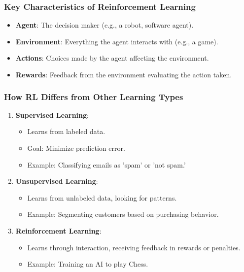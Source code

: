 \documentclass[aspectratio=169]{beamer}
\begin{document}
\begin{frame}[fragile]
    \frametitle{Key Characteristics of Reinforcement Learning}
    \begin{itemize}
        \item \textbf{Agent}: The decision maker (e.g., a robot, software agent).
        \item \textbf{Environment}: Everything the agent interacts with (e.g., a game).
        \item \textbf{Actions}: Choices made by the agent affecting the environment.
        \item \textbf{Rewards}: Feedback from the environment evaluating the action taken.
    \end{itemize}
\end{frame}

\begin{frame}[fragile]
    \frametitle{How RL Differs from Other Learning Types}
    \begin{enumerate}
        \item \textbf{Supervised Learning}:
            \begin{itemize}
                \item Learns from labeled data.
                \item Goal: Minimize prediction error.
                \item Example: Classifying emails as 'spam' or 'not spam.'
            \end{itemize}
        \item \textbf{Unsupervised Learning}:
            \begin{itemize}
                \item Learns from unlabeled data, looking for patterns.
                \item Example: Segmenting customers based on purchasing behavior.
            \end{itemize}
        \item \textbf{Reinforcement Learning}:
            \begin{itemize}
                \item Learns through interaction, receiving feedback in rewards or penalties.
                \item Example: Training an AI to play Chess.
            \end{itemize}
    \end{enumerate}
\end{frame}
\end{document}

